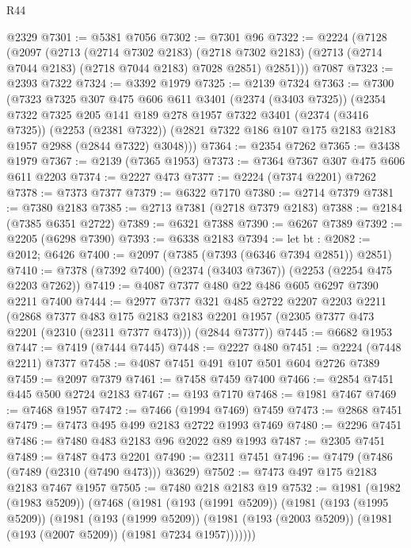 \begin{lexlean}{R44}
\begin{coremodule}
    @2329
@7301 := @5381 @7056
@7302 := @7301 @96
@7322 := @2224
    (@7128
      (@2097
        (@2713
          (@2714 @7302 @2183)
          (@2718 @7302 @2183)
          (@2713 (@2714 @7044 @2183) (@2718 @7044 @2183) @7028 @2851)
          @2851)))
    @7087
@7323 := @2393 @7322
@7324 := @3392 @1979
@7325 := @2139 @7324
@7363 := @7300
    (@7323
      @7325
      @307
      @475
      @606
      @611
      @3401
      (@2374 (@3403 @7325))
      (@2354
        @7322
        @7325
        @205
        @141
        @189
        @278
        @1957
        @7322
        @3401
        (@2374 (@3416 @7325))
        (@2253 (@2381 @7322))
        (@2821 @7322 @186 @107 @175 @2183 @2183 @1957 @2988 (@2844 @7322) @3048)))
@7364 := @2354 @7262
@7365 := @3438 @1979
@7367 := @2139 (@7365 @1953)
@7373 := @7364 @7367 @307 @475 @606 @611 @2203
@7374 := @2227 @473
@7377 := @2224 (@7374 @2201) @7262
@7378 := @7373 @7377
@7379 := @6322 @7170
@7380 := @2714 @7379
@7381 := @7380 @2183
@7385 := @2713 @7381 (@2718 @7379 @2183)
@7388 := @2184 (@7385 @6351 @2722)
@7389 := @6321 @7388
@7390 := @6267 @7389
@7392 := @2205 (@6298 @7390)
@7393 := @6338 @2183
@7394 := let bt : @2082 := @2012; @6426
@7400 := @2097 (@7385 (@7393 (@6346 @7394 @2851)) @2851)
@7410 := @7378 (@7392 @7400) (@2374 (@3403 @7367)) (@2253 (@2254 @475 @2203 @7262))
@7419 := @4087 @7377 @480 @22 @486 @605 @6297 @7390 @2211 @7400
@7444 := @2977
    @7377
    @321
    @485
    @2722
    @2207
    @2203
    @2211
    (@2868
      @7377
      @483
      @175
      @2183
      @2183
      @2201
      @1957
      (@2305 @7377 @473 @2201 (@2310 (@2311 @7377 @473)))
      (@2844 @7377))
@7445 := @6682 @1953
@7447 := @7419 (@7444 @7445)
@7448 := @2227 @480
@7451 := @2224 (@7448 @2211) @7377
@7458 := @4087 @7451 @491 @107 @501 @604 @2726 @7389
@7459 := @2097 @7379
@7461 := @7458 @7459 @7400
@7466 := @2854 @7451 @445 @500 @2724 @2183
@7467 := @193 @7170
@7468 := @1981 @7467
@7469 := @7468 @1957
@7472 := @7466 (@1994 @7469) @7459
@7473 := @2868 @7451
@7479 := @7473 @495 @499 @2183 @2722 @1993 @7469
@7480 := @2296 @7451
@7486 := @7480 @483 @2183 @96 @2022 @89 @1993
@7487 := @2305 @7451
@7489 := @7487 @473 @2201
@7490 := @2311 @7451
@7496 := @7479 (@7486 (@7489 (@2310 (@7490 @473))) @3629)
@7502 := @7473 @497 @175 @2183 @2183 @7467 @1957
@7505 := @7480 @218 @2183 @19
@7532 := @1981
    (@1982 (@1983 @5209))
    (@7468
      (@1981
        (@193 (@1991 @5209))
        (@1981
          (@193 (@1995 @5209))
          (@1981
            (@193 (@1999 @5209))
            (@1981 (@193 (@2003 @5209)) (@1981 (@193 (@2007 @5209)) (@1981 @7234 @1957)))))))

\end{coremodule}
\end{lexlean}
